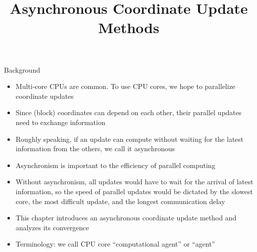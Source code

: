 \documentclass[10pt,mathserif]{beamer}
\title{\large \bfseries Asynchronous Coordinate Update Methods}
\begin{document}
\frame{
\thispagestyle{empty}
\titlepage
}

\begin{frame}{Background}
    \begin{itemize}
        \item Multi-core CPUs are common. To use CPU cores, we hope to parallelize coordinate updates 
        \item Since (block) coordinates can depend on each other, their parallel updates need to exchange information
        \item  Roughly speaking, if an update can compute without waiting for the latest information from the others, we call it asynchronous
        \item Asynchronism is important to the efficiency of parallel computing
        \item Without asynchronism, all updates would have to wait for the arrival of latest information, so the speed of parallel updates would be dictated by the slowest core, the most difficult update, and the longest communication delay
        \item This chapter introduces an asynchronous coordinate update method and analyzes its convergence
        \item Terminology: we call CPU core ``computational agent'' or ``agent''
    \end{itemize}
\end{frame}
\end{document}
